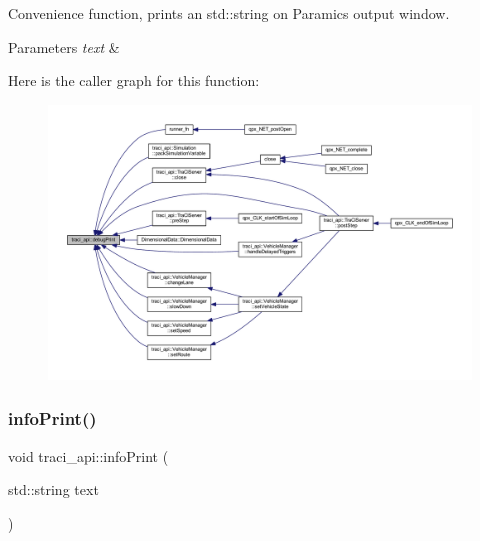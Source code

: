 Convenience function, prints an std\+::string on Paramics\textquotesingle{} output window. 


\begin{DoxyParams}{Parameters}
{\em text} & \\
\hline
\end{DoxyParams}
Here is the caller graph for this function\+:
\nopagebreak
\begin{figure}[H]
\begin{center}
\leavevmode
\includegraphics[width=350pt]{namespacetraci__api_a8179b41c12626fc5444d12ee3a6f19cb_icgraph}
\end{center}
\end{figure}
\mbox{\label{namespacetraci__api_a3d103fa606d4762c375bac42c66f62a8}} 
\subsubsection{\texorpdfstring{info\+Print()}{infoPrint()}}
{\footnotesize\ttfamily void traci\+\_\+api\+::info\+Print (\begin{DoxyParamCaption}\item[{std\+::string}]{text }\end{DoxyParamCaption})}

